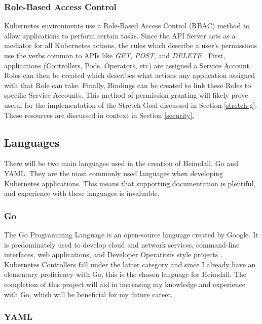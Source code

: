 \documentclass{article}
\begin{document}
\subsubsection{Role-Based Access Control}

Kubernetes environments use a Role-Based Access Control (RBAC) method to allow applications to perform certain tasks. Since the API Server acts as a mediator for all Kubernetes actions, the rules which describe a user's permissions use the verbs common to APIs like \emph{GET}, \emph{POST}, and \emph{DELETE} \cite{rbac}. First, applications (Controllers, Pods, Operators, etc) are assigned a Service Account. Roles can then be created which describes what actions any application assigned with that Role can take. Finally, Bindings can be created to link these Roles to specific Service Accounts. This method of permission granting will likely prove useful for the implementation of the Stretch Goal discussed in Section \ref{stretch-g}. These resources are discussed in context in Section \ref{security}.



\subsection{Languages}
There will be two main languages used in the creation of Heimdall, Go and YAML. They are the most commonly used languages when developing Kubernetes applications. This means that supporting documentation is plentiful, and experience with these languages is invaluable.  

\subsubsection{Go}

The Go Programming Language is an open-source language created by Google. It is predominately used to develop cloud and network services, command-line interfaces, web applications, and Developer Operations style projects \cite{go-dev}. Kubernetes Controllers fall under the latter category and since I already have an elementary proficiency with Go, this is the chosen language for Heimdall. The completion of this project will aid in increasing my knowledge and experience with Go, which will be beneficial for my future career.

\subsubsection{YAML}
\end{document}
